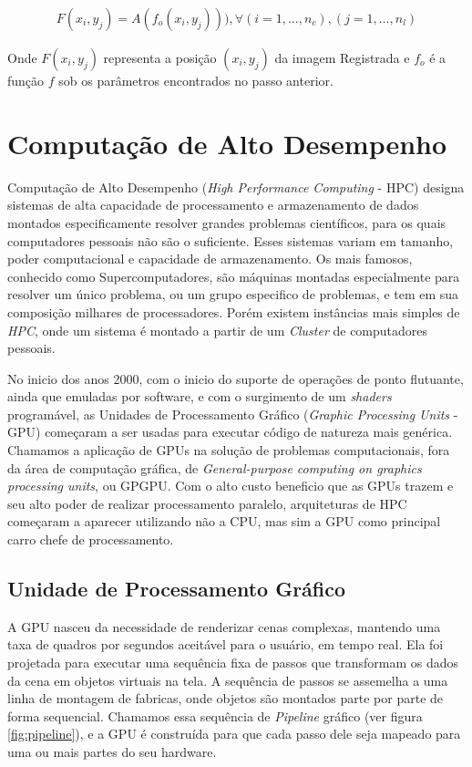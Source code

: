 \begin{align}\label{eq:reamostragem}
    F(x_i,y_j) = A(f_o(x_i,y_j))), \forall (i = 1, \dots, n_c), (j = 1, \dots, n_l)
\end{align}

    Onde $F(x_i,y_j)$ representa a posição $(x_i,y_j)$ da imagem Registrada e $f_o$ é a função $f$ sob os parâmetros
encontrados no passo anterior.

\section{Computação de Alto Desempenho}\label{GPGPU}

    Computação de Alto Desempenho (\textit{High Performance Computing} - HPC) designa sistemas de alta capacidade de processamento
e armazenamento de dados montados especificamente resolver grandes problemas científicos, para os quais computadores pessoais não
são o suficiente. Esses sistemas variam em tamanho, poder computacional e capacidade de armazenamento. Os mais famosos,
conhecido como Supercomputadores, são máquinas montadas especialmente para resolver um único problema, ou um grupo
especifico de problemas, e tem em sua composição milhares de processadores. Porém existem instâncias mais simples de
\textit{HPC}, onde um sistema é montado a partir de um \textit{Cluster} de computadores pessoais.

    No inicio dos anos 2000, com o inicio do suporte de operações de ponto flutuante, ainda que emuladas por software,
e com o surgimento de um \textit{shaders} programável, as Unidades de Processamento Gráfico
(\textit{Graphic Processing Units} - GPU) começaram a ser usadas para executar código de natureza mais genérica.
Chamamos a aplicação de GPUs na solução de problemas computacionais, fora da área de computação gráfica,
de \textit{General-purpose computing on graphics processing units}, ou GPGPU. Com o alto custo beneficio que as GPUs
trazem e seu alto poder de realizar processamento paralelo, arquiteturas de HPC começaram a aparecer utilizando não a
CPU, mas sim a GPU como principal carro chefe de processamento.

\subsection{Unidade de Processamento Gráfico}
    A GPU nasceu da necessidade de renderizar cenas complexas, mantendo uma taxa de quadros por segundos
aceitável para o usuário, em tempo real. Ela foi projetada para executar uma sequência fixa de passos que transformam
os dados da cena em objetos virtuais na tela. A sequência de passos se assemelha a uma linha de montagem de fabricas,
onde objetos são montados parte por parte de forma sequencial. Chamamos essa sequência de \textit{Pipeline} gráfico
(ver figura \ref{fig:pipeline}), e a GPU é construída para que cada passo dele seja mapeado para uma ou mais partes do
seu hardware.

